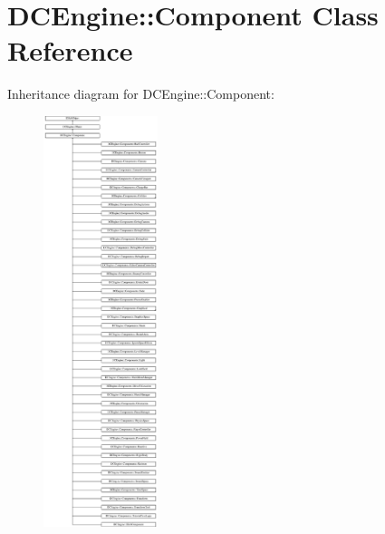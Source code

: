 \hypertarget{classDCEngine_1_1Component}{\section{D\-C\-Engine\-:\-:Component Class Reference}
\label{classDCEngine_1_1Component}
}
Inheritance diagram for D\-C\-Engine\-:\-:Component\-:\begin{figure}[H]
\begin{center}
\leavevmode
\includegraphics[height=12.000000cm]{classDCEngine_1_1Component}
\end{center}
\end{figure}
